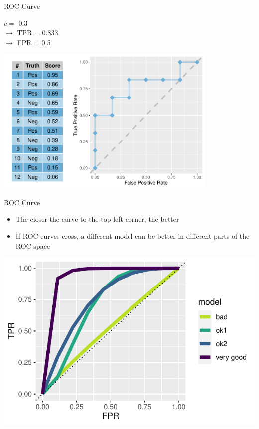 \documentclass[11pt,compress,t,notes=noshow, xcolor=table]{beamer}
\newenvironment{knitrout}{}{} %
\begin{document}
\begin{vbframe}{ROC Curve}
\begin{knitrout}
{}



\end{knitrout}

$c =$ 0.3\\ 
$\rightarrow$ TPR = 0.833 \\
$\rightarrow$ FPR = 0.5

\framebreak

\begin{knitrout}\scriptsize
{}\color{fgcolor}

{\centering \includegraphics[width=0.8\textwidth]{figure/eval_mclass_roc_sp_11} 

}



\end{knitrout}

\end{vbframe}

\begin{vbframe}{ROC Curve}
\begin{itemize}
  \item The closer the curve to the top-left corner, the better
  \item If ROC curves cross, a different model can be better in different parts of the ROC space
\end{itemize}
\begin{knitrout}\scriptsize
{}\color{fgcolor}

{\centering \includegraphics[width=.65\textwidth]{figure/eval_mclass_roc_sp_12} 

}



\end{knitrout}
\end{vbframe}
\end{document}
